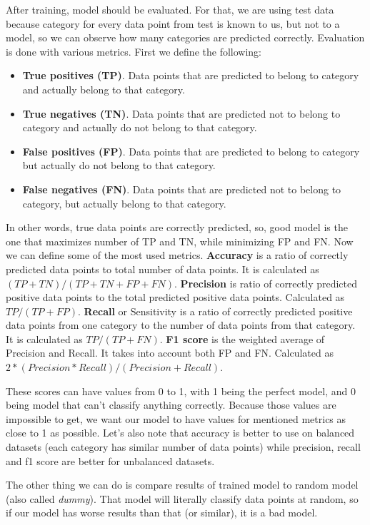 \documentclass[a4paper]{article}
\begin{document}
After training, model should be evaluated. For that, we are using test data because category for every data point from test is known to us, but not to a model, so we can observe how many categories are predicted correctly. Evaluation is done with various metrics. First we define the following:

\begin{itemize}
	\item \textbf{True positives (TP)}. Data points that are predicted to belong to category and actually belong to that category.
	\item \textbf{True negatives (TN)}. Data points that are predicted not to belong to category and actually do not belong to that category.
	\item \textbf{False positives (FP)}. Data points that are predicted to belong to category but actually do not belong to that category. 
	\item \textbf{False negatives (FN)}. Data points that are predicted not to belong to category, but actually belong to that category.
\end{itemize}

In other words, true data points are correctly predicted, so, good model is the one that maximizes number of TP and TN, while minimizing FP and FN. Now we can define some of the most used metrics. \textbf{Accuracy} is a ratio of correctly predicted data points to total number of data points. It is calculated as $(TP + TN) / (TP + TN + FP + FN)$. \textbf{Precision} is ratio of correctly predicted positive data points to the total predicted positive data points. Calculated as $TP / (TP + FP)$. \textbf{Recall} or Sensitivity is a ratio of correctly predicted positive data points from one category to the number of data points from that category. It is calculated as $TP / (TP + FN)$. \textbf{F1 score} is the weighted average of Precision and Recall. It takes into account both FP and FN. Calculated as $2 * (Precision * Recall) / (Precision + Recall)$.

These scores can have values from 0 to 1, with 1 being the perfect model, and 0 being model that can't classify anything correctly. Because those values are impossible to get, we want our model to have values for mentioned metrics as close to 1 as possible. Let's also note that accuracy is better to use on balanced datasets (each category has similar number of data points) while precision, recall and f1 score are better for unbalanced datasets.

The other thing we can do is compare results of trained model to random model (also called \textit{dummy}). That model will literally classify data points at random, so if our model has worse results than that (or similar), it is a bad model. 
\end{document}
